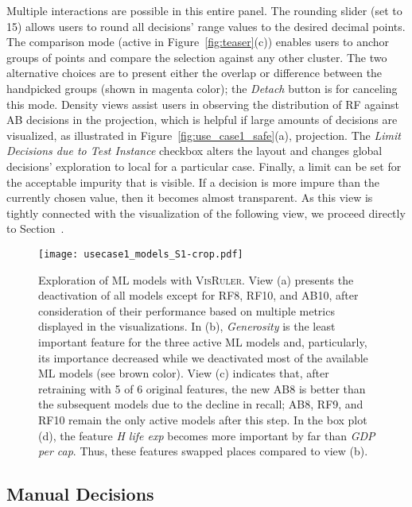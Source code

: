 Multiple interactions are possible in this entire panel. The rounding slider (set to 15) allows users to round all decisions' range values to the desired decimal points. The comparison mode (active in Figure~\ref{fig:teaser}(c)) enables users to anchor groups of points and compare the selection against any other cluster. The two alternative choices are to present either the overlap or difference between the handpicked groups (shown in magenta color); the \emph{Detach} button is for canceling this mode. Density views assist users in observing the distribution of RF against AB decisions in the projection, which is helpful if large amounts of decisions are visualized, as illustrated in Figure~\ref{fig:use_case1_safe}(a), projection. The \emph{Limit Decisions due to Test Instance} checkbox alters the layout and changes global decisions' exploration to local for a particular case. Finally, a limit can be set for the acceptable impurity that is visible. If a decision is more impure than the currently chosen value, then it becomes almost transparent. As this view is tightly connected with the visualization of the following view, we proceed directly to Section~.

\begin{figure*}[tb]
\centering
\texttt{[image: usecase1\_models\_S1-crop.pdf]}
\caption{Exploration of ML models with \textsc{VisRuler}. View (a) presents the deactivation of all models except for RF8, RF10, and AB10, after consideration of their performance based on multiple metrics displayed in the visualizations. In (b), \emph{Generosity} is the least important feature for the three active ML models and, particularly, its importance decreased while we deactivated most of the available ML models (see brown color). View (c) indicates that, after retraining with 5 of 6 original features, the new AB8 is better than the subsequent models due to the decline in recall; AB8, RF9, and RF10 remain the only active models after this step. In the box plot (d), the feature \emph{H life exp} becomes more important by far than \emph{GDP per cap}. Thus, these features swapped places compared to view (b).}
\label{fig:use_case1_model}
\end{figure*}

\subsection{Manual Decisions} \label{sec:manual}

